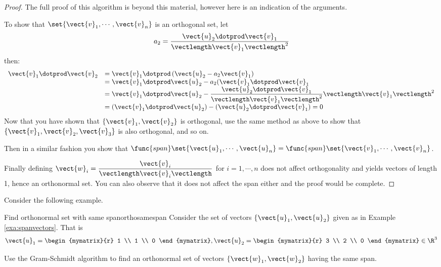 \begin{proof}
The full proof of this algorithm is beyond this material, however here is an indication of the arguments. 

To show that  $\set{\vect{v}_1,\cdots , \vect{v}_n  } $ is an orthogonal set, let 
\[ a_2 =  \dfrac{ \vect{u}_2 \dotprod \vect{v}_1}{\vectlength \vect{v}_1 \vectlength^2} \]
then: 
\[
\begin{array}{ll}
 \vect{v}_1 \dotprod \vect{v}_2 &  =  \vect{v}_1 \dotprod \left( \vect{u}_2 - a_2 \vect{v}_1 \right)  \\
 & = \vect{v}_1 \dotprod \vect{u}_2 - a_2 (\vect{v}_1 \dotprod \vect{v}_1  \\
 & = \vect{v}_1 \dotprod \vect{u}_2 - \dfrac{ \vect{u}_2 \dotprod \vect{v}_1}{\vectlength \vect{v}_1 \vectlength^2} \vectlength \vect{v}_1 \vectlength^2 \\
 & = ( \vect{v}_1 \dotprod \vect{u}_2 ) - ( \vect{u}_2 \dotprod \vect{v}_1 ) =0\\
\end{array}
\]
Now that you have shown that $\{\vect{v}_1, \vect{v}_2\}$ is orthogonal,  use the same method as above to show that 
$\{\vect{v}_1, \vect{v}_2, \vect{v}_3\}$ is also orthogonal,  and so on. 

Then in a similar fashion you show that $\func{span}\set{
\vect{u}_1,\cdots ,\vect{u}_n } = \func{span}\set{
\vect{v}_1,\cdots ,\vect{v}_n }$.

Finally defining $\vect{w}_i =
\dfrac{\vect{v}_i}{\vectlength\vect{v}_i\vectlength}$ for $i=1, \cdots
,n$ does not affect orthogonality and yields vectors of length 1,
hence an orthonormal set. You can also observe that it does not affect
the span either and the proof would be complete.
\end{proof}

Consider the following example.

\begin{example}{Find orthonormal set with same span}{orthosamespan}
Consider the set of vectors $\{\vect{u}_1, \vect{u}_2\}$ given as in Example \ref{exa:spanvectors}. That is  
\[
\vect{u}_1=\begin{mymatrix}{r}
1 \\
1 \\
0
\end{mymatrix}, \vect{u}_2=\begin{mymatrix}{r}
3 \\
2 \\
0
\end{mymatrix} \in \R^{3} 
\]

Use the Gram-Schmidt algorithm to find an orthonormal set of vectors $\{\vect{w}_1, \vect{w}_2\}$ having the same span.
\end{example}

